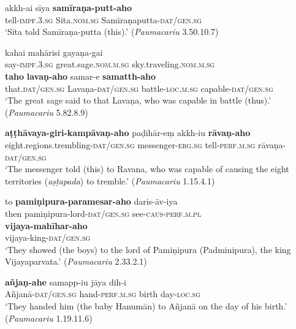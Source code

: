 \documentclass[output=paper,
modfonts
]{LSP/langsci}
\begin{document}
\begin{exe}
\ex\label{ex:wxy}
\begin{xlist}
\ex\label{ex:akkhai}\gll akkh-ai sīya \textbf{samīraṇa-putt-aho} \\ tell-\textsc{impf.3.sg} Sita.\textsc{nom.sg} Samīraṇaputta-\textsc{dat/gen.sg} \\
\glt `Sita told Samīraṇa-putta (this).' (\textit{Paumacariu} 3.50.10.7)

\ex\label{ex:kahai}\gll kahai mahārisi gayaṇa-gai  \\
say-\textsc{impf.3.sg} great.sage.\textsc{nom.m.sg} sky.traveling.\textsc{nom.m.sg} \\

\gll \textbf{taho} \textbf{lavaṇ-aho} samar-e \textbf{samatth-aho} \\ 
that.\textsc{dat/gen.sg} Lavaṇa-\textsc{dat/gen.sg} battle-\textsc{loc.m.sg} capable-\textsc{dat/gen.sg} \\
\glt `The great sage said to that Lavaṇa, who was capable in battle (thus).' (\textit{Paumacariu} 5.82.8.9) 
\end{xlist}

\ex\label{ex:zab}
\begin{xlist}
\ex\gll \textbf{aṭṭhāvaya-giri-kampāvaṇ-aho} paḍihār-eṃ  akkh-iu \textbf{rāvaṇ-aho} \\
eight.regions.trembling-\textsc{dat/gen.sg} messenger-\textsc{erg.sg} tell-\textsc{perf.m.sg} rāvaṇa-\textsc{dat/gen.sg}  \\
\glt `The messenger told (this) to Ravana, who was capable of causing the eight territories (\textit{aṣṭapada}) to tremble.' (\textit{Paumacariu} 1.15.4.1)

\ex\gll to \textbf{pamiṇipura-paramesar-aho}    daris-āv-iya\\
then pamiṇipura-lord-\textsc{dat/gen.sg} see-\textsc{caus-perf.m.pl}\\

\gll \textbf{vijaya-mahīhar-aho} \\
 vijaya-king-\textsc{dat/gen.sg} \\
\glt `They showed (the boys) to the lord of Pamiṇipura (Padminipura), the king Vijayaparvata.' (\textit{Paumacariu} 2.33.2.1)

\ex\gll \textbf{añjaṇ-ahe} samapp-iu jāya dih-i \\ Añjanā-\textsc{dat/gen.sg} hand-\textsc{perf.m.sg} birth day-\textsc{loc.sg} \\
\glt `They handed him (the baby Hanumān) to Añjanā on the day of his birth.' (\textit{Paumacariu} 1.19.11.6)
\end{xlist}
\end{exe}
\end{document}
